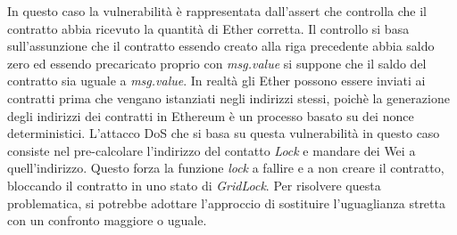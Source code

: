 \documentclass[../../Thesis.tex]{subfiles}
\begin{document}
In questo caso la vulnerabilità è rappresentata dall'assert che controlla che il contratto abbia ricevuto la quantità di Ether corretta. Il controllo si basa sull'assunzione che il contratto essendo creato alla riga precedente abbia saldo zero ed essendo precaricato proprio con \emph{msg.value} si suppone che il saldo del contratto sia uguale a \emph{msg.value}. In realtà gli Ether possono essere inviati ai contratti prima che vengano istanziati negli indirizzi stessi, poichè la generazione degli indirizzi dei contratti in Ethereum è un processo basato su dei nonce deterministici. L'attacco DoS che si basa su questa vulnerabilità in questo caso consiste nel pre-calcolare l'indirizzo del contatto \emph{Lock} e mandare dei Wei a quell'indirizzo. Questo forza la funzione \emph{lock} a fallire e a non creare il contratto, bloccando il contratto in uno stato di \emph{GridLock}.  Per risolvere questa problematica, si potrebbe adottare l'approccio di sostituire l'uguaglianza stretta con un confronto maggiore o uguale. 
\end{document}
